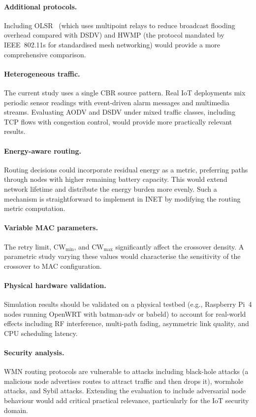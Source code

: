 \paragraph{Additional protocols.}
Including OLSR~\cite{clausen2003olsr} (which uses multipoint relays to reduce broadcast
flooding overhead compared with DSDV) and HWMP (the protocol mandated by IEEE~802.11s
for standardised mesh networking) would provide a more comprehensive comparison.

\paragraph{Heterogeneous traffic.}
The current study uses a single CBR source pattern. Real IoT deployments mix periodic
sensor readings with event-driven alarm messages and multimedia streams. Evaluating AODV
and DSDV under mixed traffic classes, including TCP flows with congestion control, would
provide more practically relevant results.

\paragraph{Energy-aware routing.}
Routing decisions could incorporate residual energy as a metric, preferring paths through
nodes with higher remaining battery capacity. This would extend network lifetime and
distribute the energy burden more evenly. Such a mechanism is straightforward to
implement in INET by modifying the routing metric computation.

\paragraph{Variable MAC parameters.}
The retry limit, $\text{CW}_{\min}$, and $\text{CW}_{\max}$ significantly affect the
crossover density. A parametric study varying these values would characterise the
sensitivity of the crossover to MAC configuration.

\paragraph{Physical hardware validation.}
Simulation results should be validated on a physical testbed (e.g., Raspberry Pi~4
nodes running OpenWRT with batman-adv or babeld) to account for real-world effects
including RF interference, multi-path fading, asymmetric link quality, and CPU
scheduling latency.

\paragraph{Security analysis.}
WMN routing protocols are vulnerable to attacks including black-hole attacks (a malicious
node advertises routes to attract traffic and then drops it), wormhole attacks, and Sybil
attacks. Extending the evaluation to include adversarial node behaviour would add
critical practical relevance, particularly for the IoT security domain.

